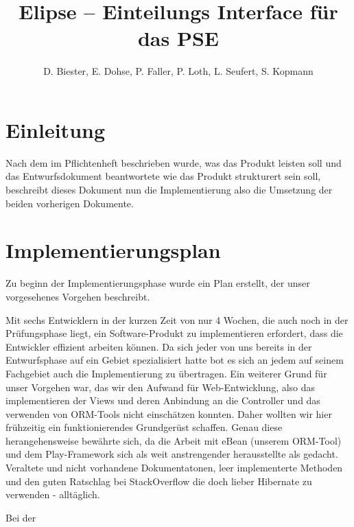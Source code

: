 \documentclass[parskip=full]{scrartcl}
\begin{document}
\title{Elipse -- Einteilungs Interface für das PSE}
\author{D. Biester, E. Dohse, P. Faller, P. Loth, L. Seufert, S. Kopmann}
\zweitgutachter{}
\mytitlepage
{\setlength{\textheight}{297mm}
\tableofcontents

\setlength{\textheight}{297mm}}
\pagebreak

\section{Einleitung}
Nach dem im Pflichtenheft beschrieben wurde, was das Produkt leisten soll und
das Entwurfsdokument beantwortete  wie das Produkt strukturert sein soll, beschreibt dieses Dokument nun die Implementierung also die Umsetzung der beiden vorherigen Dokumente. 

\section{Implementierungsplan}
Zu beginn der Implementierungsphase wurde ein Plan erstellt, der unser
vorgesehenes Vorgehen beschreibt.

Mit sechs Entwicklern in der kurzen Zeit von nur 4 Wochen, die auch noch in der
Prüfungsphase liegt, ein Software-Produkt zu implementieren erfordert, dass die
Entwickler effizient arbeiten können. Da sich jeder von uns bereits in der
Entwurfsphase auf ein Gebiet spezialisiert hatte bot es sich an jedem auf seinem
Fachgebiet auch die Implementierung zu übertragen. 
Ein weiterer Grund für unser Vorgehen war, das wir den Aufwand für
Web-Entwicklung, also das implementieren der Views und deren Anbindung an
die Controller und das verwenden von ORM-Tools nicht einschätzen konnten. Daher
wollten wir hier frühzeitig ein funktionierendes Grundgerüst schaffen.
Genau diese herangehensweise bewährte sich, da die Arbeit mit eBean (unserem
ORM-Tool) und dem Play-Framework sich als weit anstrengender herausstellte als
gedacht. Veraltete und nicht vorhandene Dokumentatonen, leer implementerte
Methoden und den guten Ratschlag bei StackOverflow die doch
lieber Hibernate zu verwenden - alltäglich.


Bei der 
\end{document}
